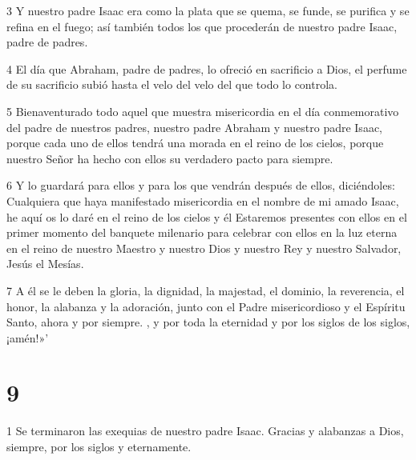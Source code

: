 \par 3 Y nuestro padre Isaac era como la plata que se quema, se funde, se purifica y se refina en el fuego; así también todos los que procederán de nuestro padre Isaac, padre de padres.

\par 4 El día que Abraham, padre de padres, lo ofreció en sacrificio a Dios, el perfume de su sacrificio subió hasta el velo del velo del que todo lo controla.

\par 5 Bienaventurado todo aquel que muestra misericordia en el día conmemorativo del padre de nuestros padres, nuestro padre Abraham y nuestro padre Isaac, porque cada uno de ellos tendrá una morada en el reino de los cielos, porque nuestro Señor ha hecho con ellos su verdadero pacto para siempre.

\par 6 Y lo guardará para ellos y para los que vendrán después de ellos, diciéndoles: Cualquiera que haya manifestado misericordia en el nombre de mi amado Isaac, he aquí os lo daré en el reino de los cielos y él Estaremos presentes con ellos en el primer momento del banquete milenario para celebrar con ellos en la luz eterna en el reino de nuestro Maestro y nuestro Dios y nuestro Rey y nuestro Salvador, Jesús el Mesías.

\par 7 A él se le deben la gloria, la dignidad, la majestad, el dominio, la reverencia, el honor, la alabanza y la adoración, junto con el Padre misericordioso y el Espíritu Santo, ahora y por siempre. , y por toda la eternidad y por los siglos de los siglos, ¡amén!»'

\chapter{9}

\par 1 Se terminaron las exequias de nuestro padre Isaac. Gracias y alabanzas a Dios, siempre, por los siglos y eternamente.



